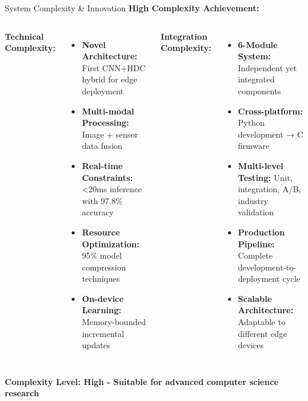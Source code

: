\documentclass[aspectratio=169]{beamer}
\begin{document}
\begin{frame}{System Complexity \& Innovation}
\textbf{High Complexity Achievement:}

\begin{columns}
\textbf{Technical Complexity:}
\begin{itemize}
\item \textbf{Novel Architecture:} First CNN+HDC hybrid for edge deployment
\item \textbf{Multi-modal Processing:} Image + sensor data fusion
\item \textbf{Real-time Constraints:} <20ms inference with 97.8\% accuracy
\item \textbf{Resource Optimization:} 95\% model compression techniques
\item \textbf{On-device Learning:} Memory-bounded incremental updates
\end{itemize}

\textbf{Integration Complexity:}
\begin{itemize}
\item \textbf{6-Module System:} Independent yet integrated components
\item \textbf{Cross-platform:} Python development → C firmware
\item \textbf{Multi-level Testing:} Unit, integration, A/B, industry validation
\item \textbf{Production Pipeline:} Complete development-to-deployment cycle
\item \textbf{Scalable Architecture:} Adaptable to different edge devices
\end{itemize}
\end{columns}

\vspace{0.5cm}
\begin{center}
\textcolor{umblue}{\textbf{Complexity Level: High - Suitable for advanced computer science research}}
\end{center}
\end{frame}
\end{document}
